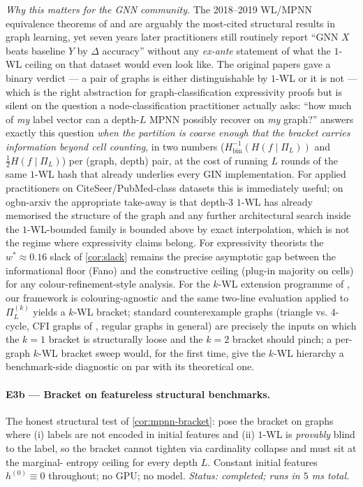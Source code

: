 \documentclass[10pt]{article}
\theoremstyle{definition}
\theoremstyle{remark}
\newcommand{\Hinv}{H_{\mathrm{bin}}^{-1}}
\begin{document}
\emph{Why this matters for the GNN community.} The 2018--2019
WL/MPNN equivalence theorems of \citet{xu2019gin} and
\citet{morris2019wl} are arguably the most-cited structural
results in graph learning, yet seven years later practitioners
still routinely report ``GNN $X$ beats baseline $Y$ by $\Delta$
accuracy'' without any \emph{ex-ante} statement of what the
$1$-WL ceiling on that dataset would even look like. The
original papers gave a binary verdict --- a pair of graphs is
either distinguishable by $1$-WL or it is not --- which is the
right abstraction for graph-classification expressivity proofs
but is silent on the question a node-classification practitioner
actually asks: ``how much of \emph{my} label vector can a
depth-$L$ MPNN possibly recover on \emph{my} graph?''
 answers exactly this question \emph{when the
partition is coarse enough that the bracket carries information
beyond cell counting}, in two numbers ($\Hinv(H(f \mid \Pi_{L}))$
and $\tfrac{1}{2} H(f \mid \Pi_{L})$) per (graph, depth) pair,
at the cost of running $L$ rounds of the same $1$-WL hash that
already underlies every GIN implementation. For applied
practitioners on CiteSeer/PubMed-class datasets this is
immediately useful; on ogbn-arxiv the appropriate take-away is
that depth-$3$ $1$-WL has already memorised the structure of
the graph and any further architectural search inside the
$1$-WL-bounded family is bounded above by exact interpolation,
which is not the regime where expressivity claims belong. For
expressivity theorists the $w^{*} \approx 0.16$ slack of
\cref{cor:slack} remains the precise asymptotic gap between the
informational floor (Fano) and the constructive ceiling
(plug-in majority on cells) for any colour-refinement-style
analysis. For the $k$-WL extension programme of
\citet{morris2020kwl}, our framework is colouring-agnostic and
the same two-line evaluation applied to $\Pi_{L}^{(k)}$ yields
a $k$-WL bracket; standard counterexample graphs (triangle
vs. $4$-cycle, CFI graphs of
\citet{cai1992optimal,arvind2015power}, regular graphs in
general) are precisely the inputs on which the $k = 1$ bracket
is structurally loose and the $k = 2$ bracket should pinch; a
per-graph $k$-WL bracket sweep would, for the first time, give
the $k$-WL hierarchy a benchmark-side diagnostic on par with
its theoretical one.

\paragraph{E3b --- Bracket on featureless structural
benchmarks.} The honest structural test of
\cref{cor:mpnn-bracket}: pose the bracket on graphs where (i)
labels are not encoded in initial features and (ii) $1$-WL is
\emph{provably} blind to the label, so the bracket cannot
tighten via cardinality collapse and must sit at the marginal-
entropy ceiling for every depth $L$. Constant initial features
$h^{(0)} \equiv 0$ throughout; no GPU; no model. \emph{Status:
completed; runs in $5$ ms total.}
\end{document}
